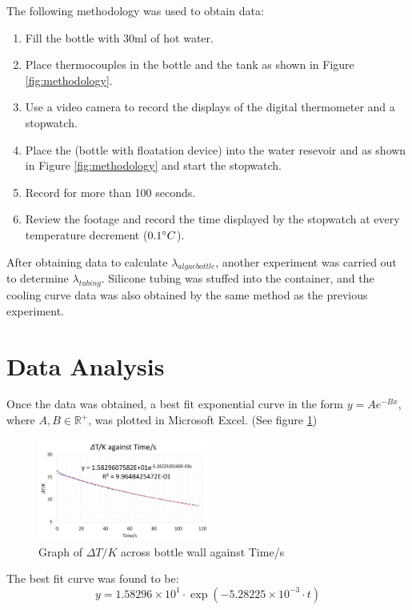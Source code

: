\documentclass[10pt,a4paper]{IEEEtran}
\begin{document}
	The following methodology was used to obtain data:
	\begin{enumerate}
		\item Fill the bottle with 30ml of hot water.
		\item Place thermocouples in the bottle and the tank as shown in Figure \ref{fig:methodology}.
		\item Use a video camera to record the displays of the digital thermometer and a stopwatch.
		\item Place the (bottle with floatation device) into the water resevoir and as shown in Figure \ref{fig:methodology} and start the stopwatch.
		\item Record for more than 100 seconds.
		\item Review the footage and record the time displayed by the stopwatch at every temperature decrement ($0.1 \degree C$).
	\end{enumerate}
	
	After obtaining data to calculate $\lambda_{algae bottle}$, another experiment was carried out to determine $\lambda_{tubing}$. Silicone tubing was stuffed into the container, and the cooling curve data was also obtained by the same method as the previous experiment.
	
	\section{Data Analysis}
	Once the data was obtained, a best fit exponential curve in the form $y = Ae^{-Bx}$, where $A, B \in \mathbb{R^{+}}$, was plotted in Microsoft Excel. (See figure \ref{fig:graph_lambdaBottle})
	
	\begin{figure}[H]
		\begin{center}
			\includegraphics[width=0.5\textwidth]{graph_lambdaBottle.png}
			\caption{Graph of $\Delta T/K$ across bottle wall against Time/s}
			\label{fig:graph_lambdaBottle}
		\end{center}
	\end{figure} 
	
	The best fit curve was found to be: 
	$$y = 1.58296 \times 10^{1} \cdot \exp(-5.28225\times 10^{-3}\cdot t)$$
	
\end{document}
